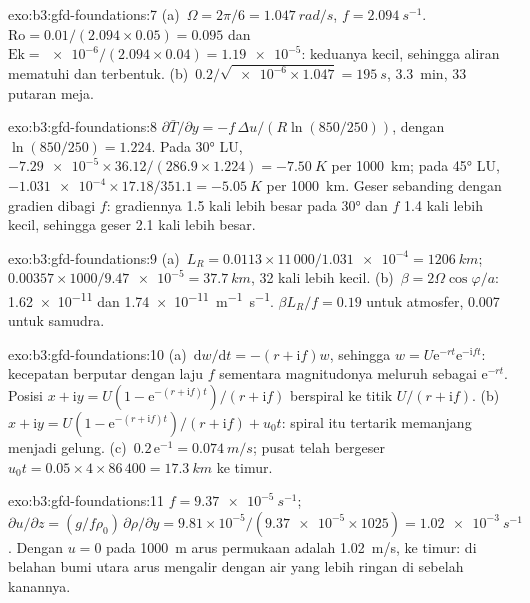 \begin{solution}{exo:b3:gfd-foundations:7}
(a)~$\Omega = 2\pi/6 = \qty{1.047}{rad/s}$, $f = \qty{2.094}{s^{-1}}$.
$\mathrm{Ro} = 0.01/(2.094\times0.05) = 0.095$ dan $\mathrm{Ek} =
\num{e-6}/(2.094\times0.04) = \num{1.19e-5}$: keduanya kecil, sehingga aliran mematuhi
 dan  terbentuk. (b)~$0.2/\sqrt{\num{e-6}
\times1.047} = \qty{195}{s}$, \qty{3.3}{min}, 33 putaran meja.
\end{solution}

\begin{solution}{exo:b3:gfd-foundations:8}
$\partial\bar T/\partial y = -f\,\Delta u/(R\ln(850/250))$, dengan
$\ln(850/250) = 1.224$. Pada \ang{30} LU, $-\num{7.29e-5}\times36.12/(286.9
\times1.224) = \qty{-7.50}{K}$ per \qty{1000}{km}; pada \ang{45} LU,
$-\num{1.031e-4}\times17.18/351.1 = \qty{-5.05}{K}$ per \qty{1000}{km}. Geser
sebanding dengan gradien dibagi $f$: gradiennya 1.5
kali lebih besar pada \ang{30} dan $f$ 1.4 kali lebih kecil, sehingga geser 2.1 kali
lebih besar.
\end{solution}

\begin{solution}{exo:b3:gfd-foundations:9}
(a)~$L_R = 0.0113\times11\,000/\num{1.031e-4} = \qty{1206}{km}$;
$0.00357\times1000/\num{9.47e-5} = \qty{37.7}{km}$, 32 kali lebih kecil.
(b)~$\beta = 2\Omega\cos\varphi/a$: \num{1.62e-11} dan
\qty{1.74e-11}{m^{-1}.s^{-1}}. $\beta L_R/f = 0.19$ untuk atmosfer, 0.007
untuk samudra.
\end{solution}

\begin{solution}{exo:b3:gfd-foundations:10}
(a)~$\mathrm dw/\mathrm dt = -(r + \mathrm if)w$, sehingga $w = U\mathrm
e^{-rt}\mathrm e^{-\mathrm ift}$: kecepatan berputar dengan laju $f$ sementara
magnitudonya meluruh sebagai $\mathrm e^{-rt}$. Posisi $x + \mathrm iy =
U(1 - \mathrm e^{-(r + \mathrm if)t})/(r + \mathrm if)$ berspiral ke
titik $U/(r + \mathrm if)$. (b)~$x + \mathrm iy = U(1 - \mathrm e^{-(r +
\mathrm if)t})/(r + \mathrm if) + u_0t$: spiral itu tertarik memanjang menjadi gelung.
(c)~$0.2\,\mathrm e^{-1} = \qty{0.074}{m/s}$; pusat telah bergeser $u_0t =
0.05\times4\times86\,400 = \qty{17.3}{km}$ ke timur.
\end{solution}

\begin{solution}{exo:b3:gfd-foundations:11}
$f = \qty{9.37e-5}{s^{-1}}$; $\partial u/\partial z = (g/f\rho_0)\,\partial
\rho/\partial y = 9.81\times10^{-5}/(\num{9.37e-5}\times1025) =
\qty{1.02e-3}{s^{-1}}$. Dengan $u = 0$ pada \qty{1000}{m} arus permukaan adalah
\qty{1.02}{m/s}, ke timur: di belahan bumi utara arus mengalir dengan
air yang lebih ringan di sebelah kanannya.
\end{solution}

